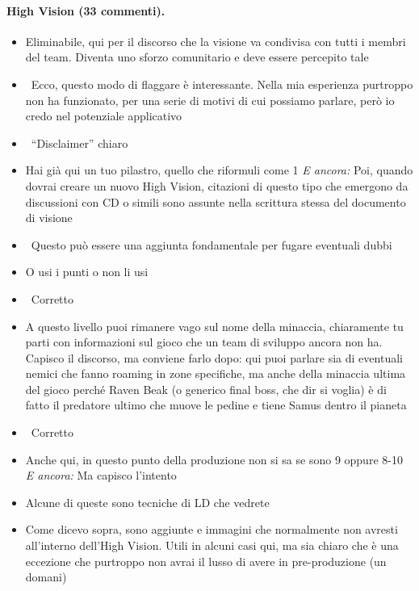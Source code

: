 \paragraph{High Vision (33 commenti).}
{\small
\begin{itemize}
  \item {} Eliminabile, qui per il discorso che la visione va condivisa con tutti i membri del team. Diventa uno sforzo comunitario e deve essere percepito tale
  \item {} \rvBene\ Ecco, questo modo di flaggare è interessante. Nella mia esperienza purtroppo non ha funzionato, per una serie di motivi di cui possiamo parlare, però io credo nel potenziale applicativo
  \item {} \rvBene\ ``Disclaimer'' chiaro
  \item {} Hai già qui un tuo pilastro, quello che riformuli come 1 \emph{E ancora:} Poi, quando dovrai creare un nuovo High Vision, citazioni di questo tipo che emergono da discussioni con CD o simili sono assunte nella scrittura stessa del documento di visione
  \item {} \rvBene\ Questo può essere una aggiunta fondamentale per fugare eventuali dubbi
  \item {} O usi i punti o non li usi
  \item {} \rvBene\ Corretto
  \item {} A questo livello puoi rimanere vago sul nome della minaccia, chiaramente tu parti con informazioni sul gioco che un team di sviluppo ancora non ha. Capisco il discorso, ma conviene farlo dopo: qui puoi parlare sia di eventuali nemici che fanno roaming in zone specifiche, ma anche della minaccia ultima del gioco perché Raven Beak (o generico final boss, che dir si voglia) è di fatto il predatore ultimo che muove le pedine e tiene Samus dentro il pianeta
  \item {} \rvBene\ Corretto
  \item {} Anche qui, in questo punto della produzione non si sa se sono 9 oppure 8-10 \emph{E ancora:} Ma capisco l'intento
  \item {} Alcune di queste sono tecniche di LD che vedrete
  \item {} Come dicevo sopra, sono aggiunte e immagini che normalmente non avresti all'interno dell'High Vision. Utili in alcuni casi qui, ma sia chiaro che è una eccezione che purtroppo non avrai il lusso di avere in pre-produzione (un domani)

\end{itemize}}
